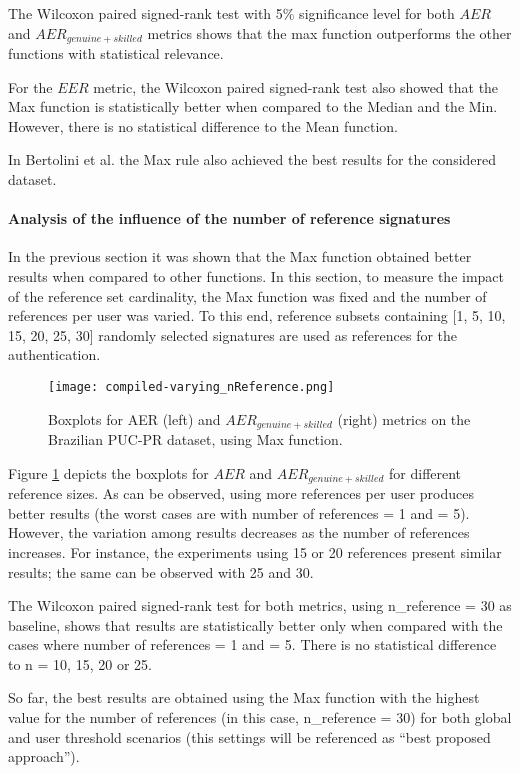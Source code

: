 \documentclass[conference]{IEEEtran}
\begin{document}
The Wilcoxon paired signed-rank test with 5\% significance level for both $AER$ and $AER_{genuine+skilled}$ metrics shows that the max function outperforms the other functions with statistical relevance. 


For the $EER$ metric, the Wilcoxon paired signed-rank test also showed that the Max function is statistically better when compared to the Median and the Min. However, there is no statistical difference to the Mean function.


In Bertolini et al. \cite{bertolini:10} the Max rule also achieved the best results for the considered dataset.


\paragraph{Analysis of the influence of the number of reference signatures}
In the previous section it was shown that the Max function obtained better results when compared to other functions. 
In this section, to measure the impact of the reference set cardinality, the Max function was fixed and the number of references per user was varied. To this end, reference subsets containing [1, 5, 10, 15, 20, 25, 30] randomly selected signatures are used as references for the authentication.


\begin{figure}[!htb]
\centering
  \texttt{[image: compiled-varying\_nReference.png]}
  \caption{Boxplots for AER (left) and $AER_{genuine+skilled}$ (right) metrics on the Brazilian PUC-PR dataset, using Max function.}
  \label{fig:varying_nReference}
\end{figure}


Figure \ref{fig:varying_nReference} depicts the boxplots for $AER$ and $AER_{genuine+skilled}$ for different reference sizes. As can be observed, using more references per user produces better results (the worst cases are with number of references = 1 and = 5). However, the variation among results decreases as the number of references increases. For instance, the experiments using 15 or 20 references present similar results; the same can be observed with 25 and 30.
  
The Wilcoxon paired signed-rank test for both metrics, using n\_reference = 30 as baseline, shows that results are statistically better only when compared with the cases where number of references = 1 and = 5. There is no statistical difference to n = 10, 15, 20 or 25.


So far, the best results are obtained using the Max function with the highest value for the number of references (in this case, n\_reference = 30) for both global and user threshold scenarios (this settings will be referenced as ``best proposed approach'').
\end{document}
